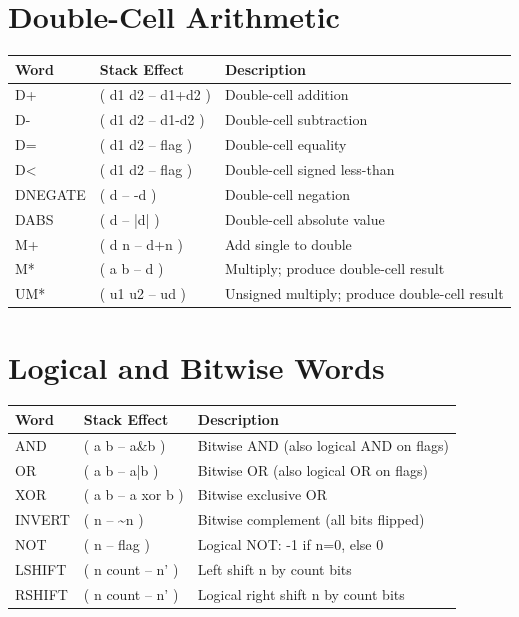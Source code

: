 \section*{Double-Cell Arithmetic}
\begin{longtable}{>{\ttfamily}lp{4.5cm}p{7cm}}
\toprule
\normalfont Word & Stack Effect & Description \\
\midrule
\endhead
\bottomrule
\endfoot
D+      & ( d1 d2 -- d1+d2 )  & Double-cell addition \\
D-      & ( d1 d2 -- d1-d2 )  & Double-cell subtraction \\
D=      & ( d1 d2 -- flag )    & Double-cell equality \\
D<      & ( d1 d2 -- flag )    & Double-cell signed less-than \\
DNEGATE & ( d -- -d )          & Double-cell negation \\
DABS    & ( d -- |d| )         & Double-cell absolute value \\
M+      & ( d n -- d+n )       & Add single to double \\
M*      & ( a b -- d )         & Multiply; produce double-cell result \\
UM*     & ( u1 u2 -- ud )      & Unsigned multiply; produce double-cell result \\
\end{longtable}

\section*{Logical and Bitwise Words}
\begin{longtable}{>{\ttfamily}lp{4.5cm}p{7cm}}
\toprule
\normalfont Word & Stack Effect & Description \\
\midrule
\endhead
\bottomrule
\endfoot
AND     & ( a b -- a\&b )     & Bitwise AND (also logical AND on flags) \\
OR      & ( a b -- a|b )      & Bitwise OR (also logical OR on flags) \\
XOR     & ( a b -- a xor b )  & Bitwise exclusive OR \\
INVERT  & ( n -- \textasciitilde n ) & Bitwise complement (all bits flipped) \\
NOT     & ( n -- flag )       & Logical NOT: -1 if n=0, else 0 \\
LSHIFT  & ( n count -- n' )   & Left shift n by count bits \\
RSHIFT  & ( n count -- n' )   & Logical right shift n by count bits \\
\end{longtable}

